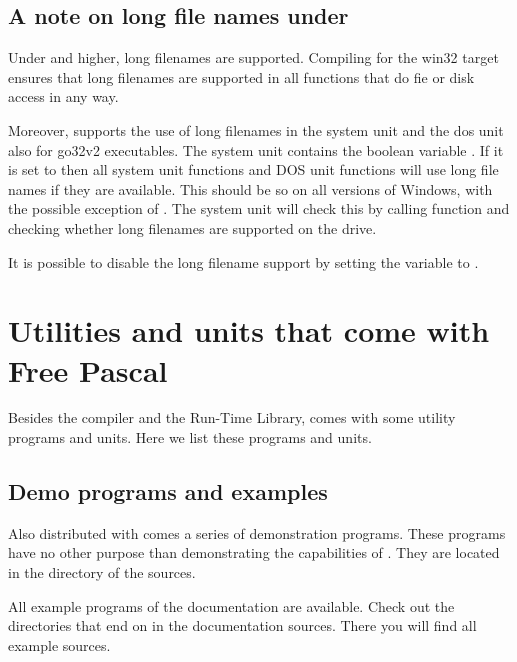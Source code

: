 \documentclass{book}
\begin{document}
\section{A note on long file names under \dos}
Under  and higher, long filenames are supported. Compiling
for the win32 target ensures that long filenames are supported in all
functions that do fie or disk access in any way.

Moreover, \fpc supports the use of long filenames in the system unit and
the dos unit also for go32v2 executables. The system unit contains the
boolean variable . If it is set to  then all
system unit functions and DOS unit functions will use long file names
if they are available. This should be so on all versions of Windows,
with the possible exception of . The system unit will check
this by calling \dos function  and checking whether long
filenames are supported on the  drive.

It is possible to disable the long filename support by setting the
 variable to .


\chapter{Utilities and units that come with Free Pascal}
\label{ch:Utilities}
Besides the compiler and the Run-Time Library, \fpc comes with some utility
programs and units. Here we list these programs and units.

\section{Demo programs and examples}
Also distributed with \fpc comes a series of demonstration programs.
These programs have no other purpose than demonstrating the capabilities of
\fpc. They are located in the  directory of the sources.

All example programs of the documentation are available. Check out the
directories that end on  in the documentation sources. There you
will find all example sources.
\end{document}
